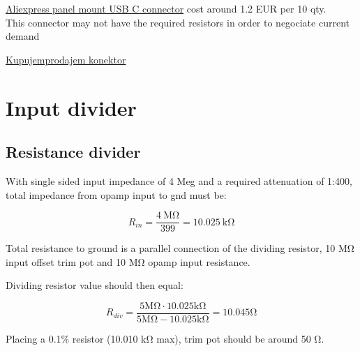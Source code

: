 \documentclass[11pt]{article}
\begin{document}
\href{https://www.aliexpress.com/item/1005005795420370.html?spm=a2g0o.detail.pcDetailTopMoreOtherSeller.8.7952vy1gvy1gDZ&gps-id=pcDetailTopMoreOtherSeller&scm=1007.40000.327270.0&scm_id=1007.40000.327270.0&scm-url=1007.40000.327270.0&pvid=2700dcaa-0eb6-4b0e-88eb-943a58278a62&_t=gps-id:pcDetailTopMoreOtherSeller,scm-url:1007.40000.327270.0,pvid:2700dcaa-0eb6-4b0e-88eb-943a58278a62,tpp_buckets:668%232846%238115%232000&pdp_npi=4%40dis%21RSD%2122.34%2118.09%21%21%210.21%210.17%21%402101ef5e17281249438301346ebeab%2112000034381437374%21rec%21SRB%21%21ABXZ&utparam-url=scene%3ApcDetailTopMoreOtherSeller%7Cquery_from%3A}{Aliexpress panel mount USB C connector}
cost around 1.2 EUR per 10 qty.\\

This connector may not have the required resistors in order to negociate 
current demand

\href{https://www.kupujemprodajem.com/elektronika-i-komponente/moduli-za-samoizgradnju/usb-c-konektor-za-montazu/oglas/149804414?filterId=4441321394}{Kupujemprodajem konektor}

\section{Input divider}
\subsection{Resistance divider}
With single sided input impedance of 4 Meg and a required attenuation of 1:400, total
impedance from opamp input to gnd must be:

\begin{equation}
  R_{in} = \frac{4\ \si{\mega \ohm}}{399} = 10.025\ \si{\kilo \ohm}
  \label{eq:res_to_gnd}
\end{equation}

Total resistance to ground is a parallel connection of the dividing resistor,
10 \si{\mega \ohm} input offset trim pot and 10 \si{\mega \ohm} opamp input resistance.

Dividing resistor value should then equal:

\begin{equation}
  R_{div} = \frac{5 \si{\mega \ohm} \cdot 
  10.025 \si{\kilo \ohm}}{5 \si{\mega \ohm} - 10.025 \si{\kilo \ohm}} = 
  10.045 \si{\ohm}
  \label{eq:input_divider}
\end{equation}

Placing a 0.1\% resistor (10.010 \si{\kilo \ohm} max), trim pot should be around 
50 \si{\ohm}.
\end{document}
